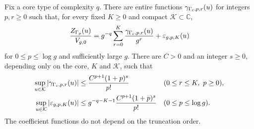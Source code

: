 \begin{prp}
\label{prp:s03:core-expansion}
Fix a core type of complexity $q$. There are entire functions
$\gamma_{\Gamma_{\rm c},p,r}(u)$ for integers $p,r\geq0$ such
that, for every fixed $K\geq0$ and compact
$\mathcal K\subset\mathbb C$,
\begin{equation}
\label{eq:s03:core-expansion}
\frac{Z_{\Gamma_p}(u)}{V_{g,0}}
=g^{-q}\sum_{r=0}^K\frac{\gamma_{\Gamma_{\rm c},p,r}(u)}{g^r}
 +\varepsilon_{g,p,K}(u)
\end{equation}
for $0\leq p\leq\log g$ and sufficiently large $g$.
There are $C>0$ and an integer $s\geq0$, depending only on the
core, $K$ and $\mathcal K$, such that
\begin{equation}
\label{eq:s03:summable-remainder}
\begin{aligned}
\sup_{u\in\mathcal K}|\gamma_{\Gamma_{\rm c},p,r}(u)|
 &\leq\frac{C^{p+1}(1+p)^s}{p!}
       &&(0\leq r\leq K,\ p\geq0),\\
\sup_{u\in\mathcal K}|\varepsilon_{g,p,K}(u)|
 &\leq g^{-q-K-1}\frac{C^{p+1}(1+p)^s}{p!}
       &&(0\leq p\leq\log g).
\end{aligned}
\end{equation}
The coefficient functions do not depend on the truncation order.
\end{prp}
